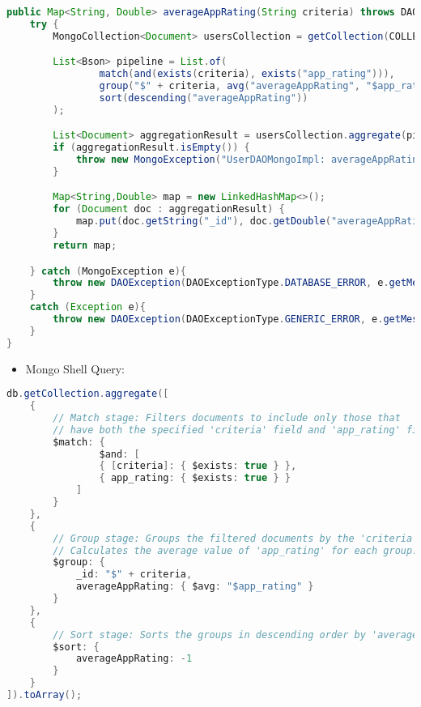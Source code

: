 \begin{mdframed}[style=customstyle]
\begin{lstlisting}[language=java]
    public Map<String, Double> averageAppRating(String criteria) throws DAOException {
    try {
        MongoCollection<Document> usersCollection = getCollection(COLLECTION_NAME);

        List<Bson> pipeline = List.of(
                match(and(exists(criteria), exists("app_rating"))),
                group("$" + criteria, avg("averageAppRating", "$app_rating")),
                sort(descending("averageAppRating"))
        );

        List<Document> aggregationResult = usersCollection.aggregate(pipeline).into(new ArrayList<>());
        if (aggregationResult.isEmpty()) {
            throw new MongoException("UserDAOMongoImpl: averageAppRating: No data found");
        }

        Map<String,Double> map = new LinkedHashMap<>();
        for (Document doc : aggregationResult) {
            map.put(doc.getString("_id"), doc.getDouble("averageAppRating"));
        }
        return map;

    } catch (MongoException e){
        throw new DAOException(DAOExceptionType.DATABASE_ERROR, e.getMessage());
    }
    catch (Exception e){
        throw new DAOException(DAOExceptionType.GENERIC_ERROR, e.getMessage());
    }
}\end{lstlisting}
\end{mdframed}
        
    \begin{itemize}
        \item Mongo Shell Query:
    \end{itemize}

\begin{mdframed}[style=customstyle]
\begin{lstlisting}[language=java]
db.getCollection.aggregate([
    { 
        // Match stage: Filters documents to include only those that 
        // have both the specified 'criteria' field and 'app_rating' field.
        $match: { 
                $and: [
                { [criteria]: { $exists: true } },
                { app_rating: { $exists: true } }
            ]
        } 
    },
    { 
        // Group stage: Groups the filtered documents by the 'criteria' field.
        // Calculates the average value of 'app_rating' for each group.
        $group: { 
            _id: "$" + criteria, 
            averageAppRating: { $avg: "$app_rating" }
        } 
    },
    { 
        // Sort stage: Sorts the groups in descending order by 'averageAppRating'.
        $sort: { 
            averageAppRating: -1 
        } 
    }
]).toArray();\end{lstlisting}
\end{mdframed}

